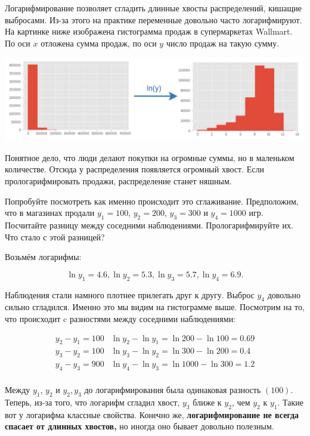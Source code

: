 \documentclass[12pt, a4paper, oneside]{article}
\theoremstyle{plain} %
\theoremstyle{definition}
\newcommand{\indef}[1]{\textbf{ \color{green} #1}}
\begin{document}
\begin{problem}{}
Логарифмирование позволяет сгладить длинные хвосты распределений, кишащие выбросами. Из-за этого на практике переменные довольно часто логарифмируют. На картинке ниже изображена гистограмма продаж в супермаркетах Wallmart. По оси $x$ отложена сумма продаж, по оси $y$ число продаж на такую сумму.  

\begin{center}
	\includegraphics[scale=0.2]{y_lny.png}
\end{center}

Понятное дело, что люди делают покупки на огромные суммы, но в маленьком количестве. Отсюда у распределения появляется огромный хвост. Если прологарифмировать продажи, распределение станет няшным.

Попробуйте посмотреть как именно происходит это сглаживание. Предположим, что в магазинах продали $y_1 =100$, $y_2 = 200$, $y_3 = 300$ и $y_4 = 1000$ игр. Посчитайте разницу между соседними наблюдениями. Прологарифмируйте их. Что стало с этой разницей? 
\end{problem}

\begin{solution}
Возьмём логарифмы: 

$$
\ln y_1 = 4.6 , \ln y_2 = 5.3, \ln y_3 =5.7, \ln y_4 = 6.9.
$$

Наблюдения стали намного плотнее прилегать друг к другу. Выброс $y_4$ довольно сильно сгладился. Именно это мы видим на гистограмме выше. Посмотрим на то, что происходит c разностями между соседними наблюдениями:


\begin{align*}
    y_2 - y_1 = 100 & \ln y_2 - \ln y_1 = \ln 200 - \ln 100 = 0.69 \\
    y_3 - y_2 = 100 & \ln y_3 - \ln y_2 = \ln 300 - \ln 200 = 0.4 \\
    y_4 - y_3 = 900 & \ln y_4 - \ln y_3 = \ln 1000 - \ln 300 = 1.2 \\
\end{align*}

Между $y_1$, $y_2$ и $y_2,y_3$ до логарифмирования была одинаковая разность $(100)$. Теперь, из-за того, что логарифм сгладил хвост, $y_3$ ближе к $y_2$, чем $y_2$ к $y_1$. Такие вот у логарифма классные свойства. Конечно же, \indef{логарифмирование не всегда спасает от длинных хвостов,} но иногда оно бывает довольно полезным. 
\end{solution}
\end{document}
